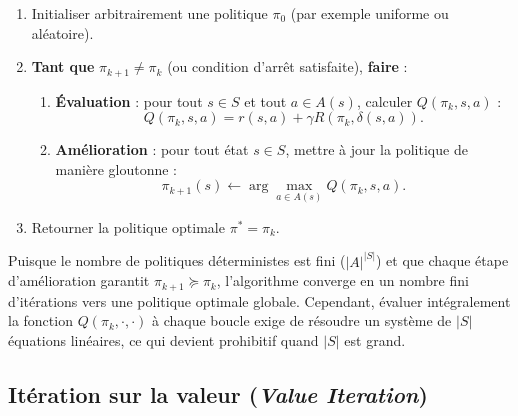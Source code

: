 \begin{algorithm}[H]
\caption{Amélioration itérative de politique (\emph{Policy Iteration})}
\begin{enumerate}
    \item Initialiser arbitrairement une politique $\pi_0$ (par exemple uniforme ou aléatoire).
    \item \textbf{Tant que} $\pi_{k+1} \neq \pi_k$ (ou condition d'arrêt satisfaite), \textbf{faire} :
    \begin{enumerate}
        \item \textbf{Évaluation} : pour tout $s \in S$ et tout $a \in A(s)$, calculer $Q(\pi_k, s, a)$ :
        \begin{equation}
            Q(\pi_k, s, a) = r(s, a) + \gamma R(\pi_k, \delta(s, a)).
        \end{equation}
        \item \textbf{Amélioration} : pour tout état $s \in S$, mettre à jour la politique de manière gloutonne :
        \begin{equation}
            \pi_{k+1}(s) \longleftarrow \arg\max_{a \in A(s)} Q(\pi_k, s, a).
        \end{equation}
    \end{enumerate}
    \item Retourner la politique optimale $\pi^* = \pi_k$.
\end{enumerate}
\end{algorithm}

\begin{remark}
    Puisque le nombre de politiques déterministes est fini ($|A|^{|S|}$) et que chaque étape d'amélioration garantit $\pi_{k+1} \succeq \pi_k$, l'algorithme converge en un nombre fini d'itérations vers une politique optimale globale. Cependant, évaluer intégralement la fonction $Q(\pi_k, \cdot, \cdot)$ à chaque boucle exige de résoudre un système de $|S|$ équations linéaires, ce qui devient prohibitif quand $|S|$ est grand.
\end{remark}

\subsection{Itération sur la valeur (\emph{Value Iteration})}

